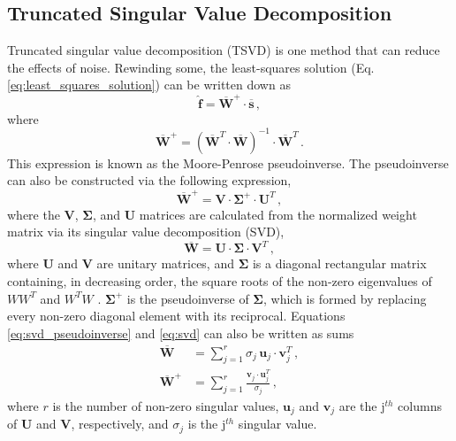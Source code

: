 \subsection{Truncated Singular Value Decomposition} \label{sec:tsvd}
Truncated singular value decomposition (TSVD) is one method that can reduce the effects of noise.
Rewinding some, the least-squares solution (Eq. \ref{eq:least_squares_solution}) can be written down as 
\begin{equation}
    \mathbf{\hat{f}} = \mathbf{\overline{W}}^+ \cdot \mathbf{\overline{s}}\,,
\end{equation}
where
\begin{equation}\label{eq:pseudoinverse}
    \mathbf{\overline{W}}^+ = \left(\mathbf{\overline{W}}^T\cdot\mathbf{\overline{W}}\right)^{-1}\cdot\mathbf{\overline{W}}^T\,.
\end{equation}
This expression is known as the Moore-Penrose pseudoinverse. The pseudoinverse can also be constructed via the following expression,
\begin{equation}\label{eq:svd_pseudoinverse}
    \mathbf{\overline{W}}^+ = \mathbf{V} \cdot \mathbf{\Sigma}^+ \cdot \mathbf{U}^T \, ,
\end{equation}
where the $\mathbf{V}$, $\mathbf{\Sigma}$, and $\mathbf{U}$ matrices are calculated from the normalized weight matrix via its singular value decomposition (SVD),
\begin{equation} \label{eq:svd}
    \mathbf{\overline{W}} = \mathbf{U} \cdot \mathbf{\Sigma} \cdot \mathbf{V}^T \,,
\end{equation}
where $\mathbf{U}$ and $\mathbf{V}$ are unitary matrices, and $\mathbf{\Sigma}$ is a diagonal rectangular matrix containing, in decreasing order, the square roots of the non-zero eigenvalues of $WW^T$ and $W^T W$ \cite{Strang}. $\mathbf{\Sigma}^+$ is the pseudoinverse of $\mathbf{\Sigma}$, which is formed by replacing every non-zero diagonal element with its reciprocal.
Equations \ref{eq:svd_pseudoinverse} and \ref{eq:svd} can also be written as sums
\begin{equation}
\begin{split}
    \mathbf{\overline{W}} &= \sum_{j=1}^r \sigma_j\, \mathbf{u}_j \cdot \mathbf{v}_j^T  \,,\\
    \mathbf{\overline{W}}^+ &= \sum_{j=1}^r \frac{\mathbf{v}_j \cdot \mathbf{u}_j^T}{\sigma_j}\,,
\end{split}
\end{equation}
where $r$ is the number of non-zero singular values, $\mathbf{u}_j$ and $\mathbf{v}_j$ are the j$^{th}$ columns of $\mathbf{U}$ and $\mathbf{V}$, respectively, and $\sigma_j$ is the j$^{th}$ singular value.

